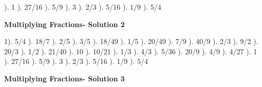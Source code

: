 \documentclass{article}%
\begin{document}
). 1%
). 27/16%
). 5/9%
). 3%
). 2/3%
). 5/16%
). 1/9%
). 5/4%
\newline%
\newpage%
\large%
\begin{center}%
\textbf{Multiplying Fractions- Solution 2}%
\newline%
\end{center} \normalsize%
1). 5/4%
). 18/7%
). 2/5%
). 3/5%
). 18/49%
). 1/5%
). 20/49%
). 7/9%
). 40/9%
). 2/3%
). 9/2%
). 20/3%
). 1/2%
). 21/40%
). 10%
). 10/21%
). 1/3%
). 4/3%
). 5/36%
). 20/9%
). 4/9%
). 4/27%
). 1%
). 27/16%
). 5/9%
). 3%
). 2/3%
). 5/16%
). 1/9%
). 5/4%
\newline%
\newpage%
\large%
\begin{center}%
\textbf{Multiplying Fractions- Solution 3}%
\newline%
\end{center} \normalsize%
\end{document}
